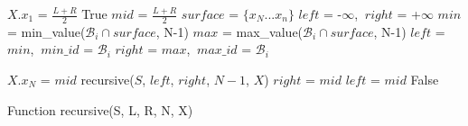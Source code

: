 \begin{algorithm}
\begin{algorithmic}[1]
\Input
\EndInput
\Output
\EndOutput
{}
    \State $X.x_1$ = $\frac{L+R}{2}$
    \State \Return True
\EndIf
{}
    \State $mid$ = $\frac{L+R}{2}$
    \State $surface$ = $\{x_{N}...x_{n}\}$
    \State $left$ = -$\infty$, $\ right$ = +$\infty$
        \State $min$ = min\_value($\mathcal{B}_i \cap surface$, N-1)
        \State $max$ = max\_value($\mathcal{B}_i \cap surface$, N-1)
            \State $left$ = $min$, $\ min\_id$ = $\mathcal{B}_i$
        \EndIf
            \State $right$ = $max$, $\ max\_id$ = $\mathcal{B}_i$
        \EndIf
    \EndFor
    
        \State $X.x_N$ = $mid$
        \State \Return recursive($S$, $left$, $right$, $N-1$, $X$)
        \State $right$ = $mid$
    \Else
        \State $left$ = $mid$
    \EndIf
\EndWhile
\State \Return False
\end{algorithmic}
\caption{Function recursive(S, L, R, N, X)}
\label{algo:recursive}
\end{algorithm}
